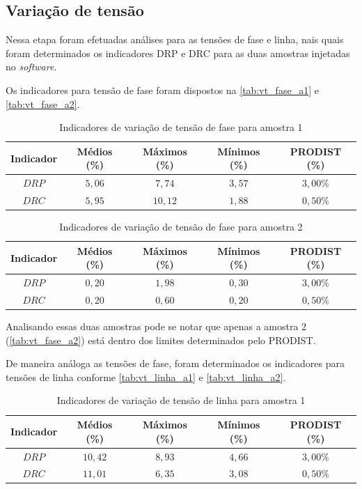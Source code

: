 \subsection{Variação de tensão}

Nessa etapa foram efetuadas análises para as tensões de fase e linha, nais quais foram determinados os indicadores DRP e DRC para as duas amostras injetadas no \textit{software}.

Os indicadores para tensão de fase foram dispostos na \autoref{tab:vt_fase_a1} e \autoref{tab:vt_fase_a2}.

\begin{table}[H]
  \centering
  \caption{Indicadores de variação de tensão de fase para amostra 1}
  \label{tab:vt_fase_a1}
  \begin{tabular}{@{}ccccc@{}}
    \toprule
   \textbf{Indicador} & \textbf{Médios (\%)} & \textbf{Máximos (\%)} & \textbf{Mínimos (\%)} & \textbf{PRODIST (\%)} \\
    \midrule
    $DRP$ & $5,06$ & $7,74$ & $3,57$ & $3,00\%$ \\
    $DRC$ & $5,95$ & $10,12$ & $1,88$ & $0,50\%$ \\
    \bottomrule
  \end{tabular}
\end{table}

\begin{table}[H]
  \centering
  \caption{Indicadores de variação de tensão de fase para amostra 2}
  \label{tab:vt_fase_a2}
  \begin{tabular}{@{}ccccc@{}}
    \toprule
   \textbf{Indicador} & \textbf{Médios (\%)} & \textbf{Máximos (\%)} & \textbf{Mínimos (\%)} & \textbf{PRODIST (\%)} \\
    \midrule
    $DRP$ & $0,20$ & $1,98$ & $0,30$ & $3,00\%$ \\
    $DRC$ & $0,20$ & $0,60$ & $0,20$ & $0,50\%$ \\
    \bottomrule
  \end{tabular}
\end{table}

Analisando essas duas amostras pode se notar que apenas a amostra 2 (\autoref{tab:vt_fase_a2}) está dentro dos limites determinados pelo PRODIST. 

De maneira análoga as tensões de fase, foram determinados os indicadores para tensões de linha conforme \autoref{tab:vt_linha_a1} e \ref{tab:vt_linha_a2}.

\begin{table}[H]
  \centering
  \caption{Indicadores de variação de tensão de linha para amostra 1}
  \label{tab:vt_linha_a1}
  \begin{tabular}{@{}ccccc@{}}
    \toprule
   \textbf{Indicador} & \textbf{Médios (\%)} & \textbf{Máximos (\%)} & \textbf{Mínimos (\%)} & \textbf{PRODIST (\%)} \\
    \midrule
    $DRP$ & $10,42$ & $8,93$ & $4,66$ & $3,00\%$ \\
    $DRC$ & $11,01$ & $6,35$ & $3,08$ & $0,50\%$ \\
    \bottomrule
  \end{tabular}
\end{table}

